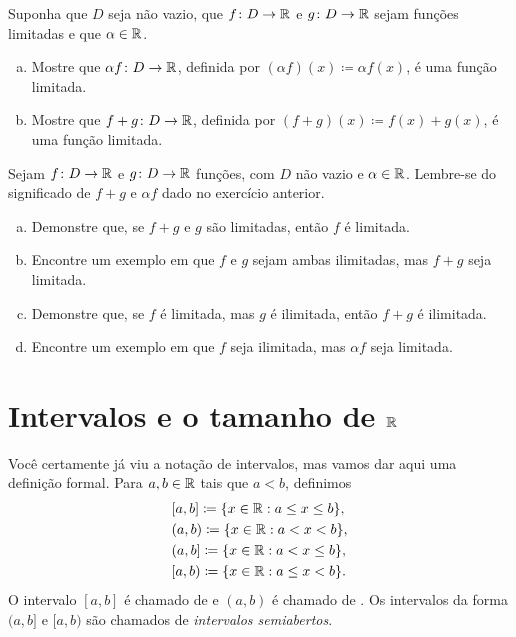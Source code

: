 \begin{exercise}
\pagebreak[2]
Suponha que $D$ seja não vazio, que $f \colon D \to {\mathbb{R}}$ e $g \colon D \to {\mathbb{R}}$ sejam
funções limitadas e que
$\alpha \in {\mathbb{R}}$.
\begin{enumerate}[a)]
\item
Mostre que $\alpha f \colon D \to {\mathbb{R}}$, definida por $(\alpha f) (x) \coloneqq \alpha
f(x)$, é uma função limitada.
\item
Mostre que $f+g \colon D \to {\mathbb{R}}$, definida por $(f+g) (x) \coloneqq f(x) + g(x)$,
é uma função limitada.
\end{enumerate}
\end{exercise}

\begin{exercise}
Sejam $f \colon D \to {\mathbb{R}}$ e $g \colon D \to {\mathbb{R}}$ funções, com $D$
não vazio e $\alpha \in {\mathbb{R}}$. Lembre-se do significado de $f+g$ e $\alpha f$ dado
no exercício anterior.
\begin{enumerate}[a)]
\item
Demonstre que, se $f+g$ e $g$ são limitadas, então $f$ é limitada.
\item
Encontre um exemplo em que $f$ e $g$ sejam ambas ilimitadas, mas $f+g$ seja
limitada.
\item
Demonstre que, se $f$ é limitada, mas $g$ é ilimitada, então $f+g$ é
ilimitada.
\item
Encontre um exemplo em que $f$ seja ilimitada, mas $\alpha f$ seja limitada.
\end{enumerate}
\end{exercise}


\sectionnewpage

\section{Intervalos e o tamanho de \texorpdfstring{${\mathbb{R}}$}{R}}
\label{sec:intandsizeR}


Você certamente já viu a notação de intervalos,
mas vamos dar aqui uma
definição formal. Para $a, b \in {\mathbb{R}}$ tais que $a < b$, definimos
%
%
%
%
%
\begin{align*}
& [a,b] \coloneqq \{ x \in {\mathbb{R}} : a \leq x \leq b \}, \\
& (a,b) \coloneqq \{ x \in {\mathbb{R}} : a < x < b \}, \\
& (a,b] \coloneqq \{ x \in {\mathbb{R}} : a < x \leq b \}, \\
& [a,b) \coloneqq \{ x \in {\mathbb{R}} : a \leq x < b \} .
\end{align*}
O intervalo $[a,b]$ é chamado de \emph{}
e $(a,b)$ é chamado de \emph{}. Os intervalos
da forma $(a,b]$ e $[a,b)$ são chamados de
\emph{intervalos semiabertos}.

